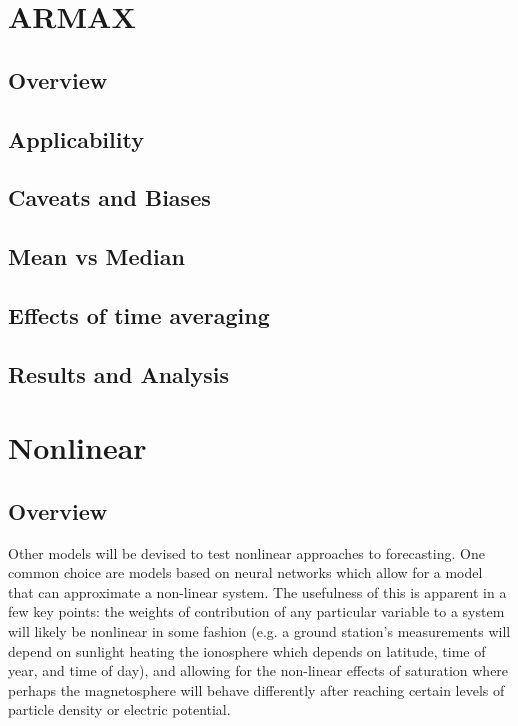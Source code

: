 \section{ARMAX}

\subsection{Overview}

\subsection{Applicability}

\subsection{Caveats and Biases}

\subsection{Mean vs Median}

\subsection{Effects of time averaging}

\subsection{Results and Analysis}

\section{Nonlinear}

\subsection{Overview}

Other models will be devised to test nonlinear approaches to forecasting. One common choice are models based on neural networks \cite{NNARMA,ANNforecast} which allow for a model that can approximate a non-linear system. The usefulness of this is apparent in a few key points: the weights of contribution of any particular variable to a system will likely be nonlinear in some fashion (e.g. a ground station's measurements will depend on sunlight heating the ionosphere which depends on latitude, time of year, and time of day), and allowing for the non-linear effects of saturation where perhaps the magnetosphere will behave differently after reaching certain levels of particle density or electric potential.

